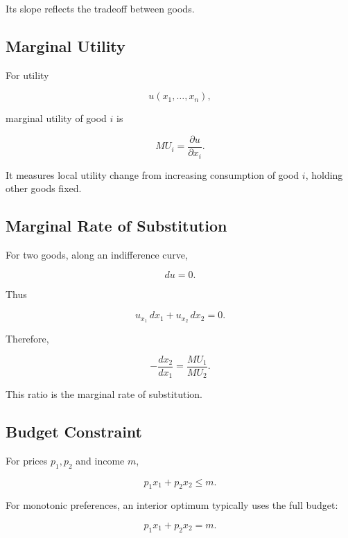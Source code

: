 Its slope reflects the tradeoff between goods.

\subsection{Marginal Utility}
\label{subsec:marginal-utility}

For utility

\[
u(x_1,\ldots,x_n),
\]

marginal utility of good \(i\) is

\[
\boxed{
MU_i
=
\frac{\partial u}{\partial x_i}.
}
\]

It measures local utility change from increasing consumption of good \(i\),
holding other goods fixed.

\subsection{Marginal Rate of Substitution}
\label{subsec:marginal-rate-substitution}

For two goods, along an indifference curve,

\[
du=0.
\]

Thus

\[
u_{x_1}\,dx_1
+
u_{x_2}\,dx_2
=
0.
\]

Therefore,

\[
\boxed{
-\frac{dx_2}{dx_1}
=
\frac{MU_1}{MU_2}.
}
\]

This ratio is the marginal rate of substitution.

\subsection{Budget Constraint}
\label{subsec:consumer-budget-constraint}

For prices \(p_1,p_2\) and income \(m\),

\[
\boxed{
p_1x_1+p_2x_2
\leq
m.
}
\]

For monotonic preferences, an interior optimum typically uses the full
budget:

\[
\boxed{
p_1x_1+p_2x_2=m.
}
\]

